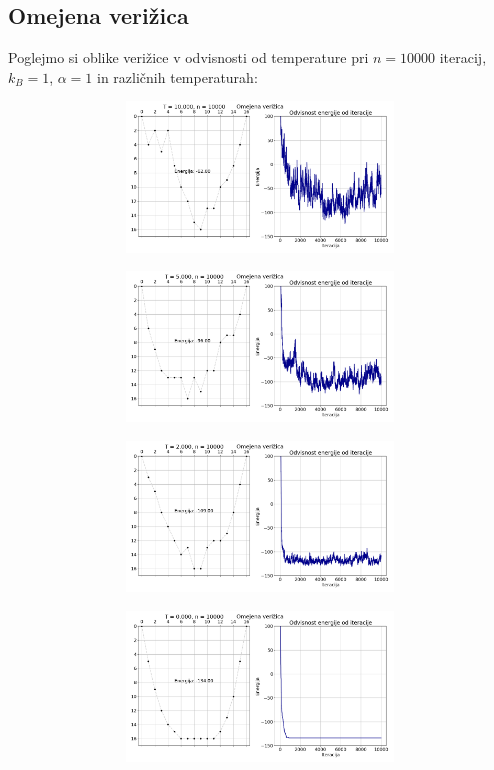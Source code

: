 \documentclass[11pt, a4paper]{article}
\begin{document}
\subsection{Omejena verižica}
Poglejmo si oblike verižice v odvisnosti od temperature pri $n=10000$ iteracij, $k_B = 1$, $\alpha = 1$ in različnih temperaturah:
\begin{figure}[H]
\centering

  \includegraphics[width=16cm, height=4cm]{omejena_globina_T0_10.png}
 
\end{figure} 
\begin{figure}[H]
\centering

  \includegraphics[width=16cm, height=4cm]{omejena_globina_T0_5.png}
 
\end{figure} 
\begin{figure}[H]
\centering

  \includegraphics[width=16cm, height=4cm]{omejena_globina_T0_2.png}
 
\end{figure} 
\begin{figure}[H]

\centering
  \includegraphics[width=16cm, height=4cm]{omejena_globina_T0_0.png}
 
\end{figure} 
\end{document}
